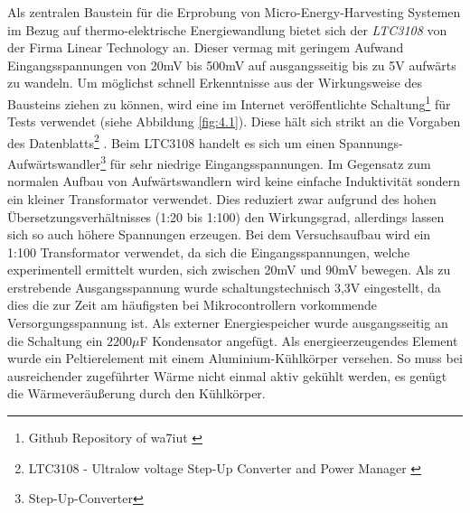 \documentclass[12pt]{scrreprt} %
\begin{document}
Als zentralen Baustein für die Erprobung von Micro-Energy-Harvesting Systemen im Bezug auf thermo-elektrische Energiewandlung bietet sich der \textit{LTC3108} von der Firma Linear Technology an. Dieser vermag mit geringem Aufwand Eingangsspannungen von 20mV bis 500mV auf ausgangsseitig bis zu 5V aufwärts zu wandeln. Um möglichst schnell Erkenntnisse aus der Wirkungsweise des Bausteins ziehen zu können, wird eine im Internet veröffentlichte Schaltung\footnote{Github Repository of wa7iut \citep{GIT}} für Tests verwendet (siehe Abbildung \vref{fig:4.1}). Diese hält sich strikt an die Vorgaben des Datenblatts\footnote{LTC3108 - Ultralow voltage Step-Up Converter and Power Manager \citep{LTC}} \citep{LTC3108}. Beim LTC3108 handelt es sich um einen Spannungs-Aufwärtswandler\footnote{Step-Up-Converter} für sehr niedrige Eingangsspannungen. Im Gegensatz zum normalen Aufbau von Aufwärtswandlern wird keine einfache Induktivität sondern ein kleiner Transformator verwendet. Dies reduziert zwar aufgrund des hohen Übersetzungsverhältnisses (1:20 bis 1:100) den Wirkungsgrad, allerdings lassen sich so auch höhere Spannungen erzeugen. Bei dem Versuchsaufbau wird ein 1:100 Transformator verwendet, da sich die Eingangsspannungen, welche experimentell ermittelt wurden, sich zwischen 20mV und 90mV bewegen. Als zu erstrebende Ausgangsspannung wurde schaltungstechnisch 3,3V eingestellt, da dies die zur Zeit am häufigsten bei Mikrocontrollern vorkommende Versorgungsspannung ist. Als externer Energiespeicher wurde ausgangsseitig an die Schaltung ein $2200 \mu$F Kondensator angefügt. Als energieerzeugendes Element wurde ein Peltierelement mit einem Aluminium-Kühlkörper versehen. So muss bei ausreichender zugeführter Wärme nicht einmal aktiv gekühlt werden, es genügt die Wärmeveräußerung durch den Kühlkörper.%
\end{document}
